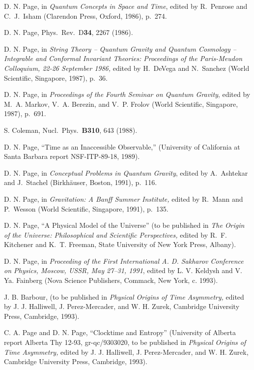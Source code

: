 \documentclass[12pt]{article}
\begin{document}
\begin{thebibliography}{999}
 D. N. Page, in {\em Quantum Concepts in Space and
Time},
edited by
R.~Penrose and C.~J.~Isham (Clarendon Press, Oxford, 1986), p.~274.

 D. N. Page, Phys.\ Rev.\ D{\bf 34}, 2267 (1986).

 D. N. Page, in {\em String Theory -- Quantum Gravity
and
Quantum Cosmology -- Integrable and Conformal Invariant Theories:
Proceedings of the Paris-Meudon Colloquium, 22-26 September 1986,}
edited by
H.~DeVega and
N.~Sanchez (World Scientific, Singapore, 1987), p.~36.

 D. N. Page, in {\em Proceedings of the Fourth Seminar
on
Quantum Gravity}, edited by M.~A. Markov, V.~A. Berezin, and V.~P.
Frolov
(World Scientific, Singapore, 1987), p.~691.

 S. Coleman, Nucl.\ Phys.\ {\bf B310}, 643 (1988).

 D. N. Page, ``Time as an Inaccessible Observable,''
(University of California at Santa Barbara report NSF-ITP-89-18,
1989).

 D. N. Page, in {\em Conceptual Problems in Quantum
Gravity}, edited by A.~Ashtekar and J.~Stachel (Birkh\"auser, Boston,
1991), p.~116.

 D. N. Page, in {\em Gravitation: A Banff Summer
Institute,} edited by R.~Mann and P.~Wesson (World
Scientific, Singapore, 1991), p.~135.

 D. N. Page, ``A Physical Model of the Universe'' (to
be
published
in {\em The Origin of the Universe: Philosophical and Scientific
Perspectives,} edited by R.~F. Kitchener and K.~T. Freeman, State
University of New York Press, Albany).

 D. N. Page, in {\em Proceeding of the First
International A. D. Sakharov Conference on Physics,
Moscow, USSR, May 27--31, 1991}, edited by L. V. Keldysh
and V. Ya. Fainberg (Nova Science Publishers, Commack,
New York, c. 1993).

 J. B. Barbour, (to be published in {\it Physical
Origins of
Time
Asymmetry,} edited by J. J. Halliwell, J. Perez-Mercader, and W. H.
Zurek,
Cambridge University Press, Cambridge, 1993).

 C. A. Page and D. N. Page, ``Clocktime and Entropy''
(University of Alberta report Alberta Thy 12-93, gr-qc/9303020,
to be published in {\em Physical Origins of Time Asymmetry,}
edited by J. J. Halliwell, J. Perez-Mercader, and
W. H. Zurek, Cambridge University Press, Cambridge, 1993).


\end{thebibliography}
\end{document}

